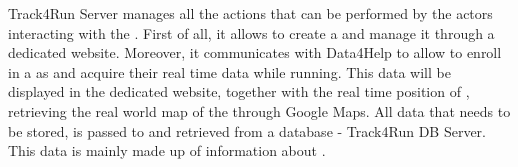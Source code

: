 \documentclass[../../DD.tex]{subfiles}
\begin{document}
	Track4Run Server manages all the actions that can be performed by the actors interacting with the . First of all, it allows  to create a  and manage it through a dedicated website. Moreover, it communicates with Data4Help to allow  to enroll in a  as  and acquire their real time data while running. This data will be displayed in the dedicated  website, together with the real time position of , retrieving the real world map of the  through Google Maps. All data that needs to be stored, is passed to and retrieved from a database - Track4Run DB Server. This data is mainly made up of information about .

	
\end{document}
